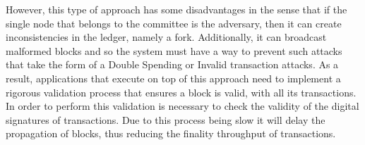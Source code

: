 % 
% 

However, this type of approach has some disadvantages in the sense that if the single node that belongs to the committee is the adversary, then it can create inconsistencies in the ledger, namely a fork. Additionally, it can broadcast malformed blocks and so the system must have a way to prevent such attacks that take the form of a Double Spending or Invalid transaction attacks. As a result, applications that execute on top of this approach need to implement a rigorous validation process that ensures a block is valid, with all its transactions. In order to perform this validation is necessary to check the validity of the digital signatures of transactions. Due to this process being slow it will delay the propagation of blocks, thus reducing the finality throughput of transactions.




